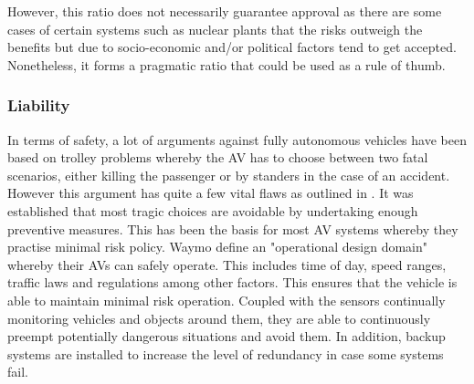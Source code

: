 However, this ratio does not necessarily guarantee approval as there are some cases of certain systems such as nuclear plants that the risks outweigh the benefits but due to socio-economic and/or political factors tend to get accepted. Nonetheless, it forms a pragmatic ratio that could be used as a rule of thumb.
\subsubsection*{Liability}
In terms of safety, a lot of arguments against fully autonomous vehicles have been based on trolley problems whereby the AV has to choose between two fatal scenarios, either killing the passenger or by standers in the case of an accident. However this argument has quite a few vital flaws as outlined in \cite{fried2012does}. It was established that most tragic choices are avoidable by undertaking enough preventive measures. This has been the basis for most AV systems whereby they practise minimal risk policy.  Waymo define an "operational design domain" whereby their AVs can safely operate. This includes time of day, speed ranges, traffic laws and regulations among other factors\cite{waymo_2018}. This ensures that the vehicle is able to maintain minimal risk operation. Coupled with the sensors continually monitoring vehicles and objects around them, they are able to continuously preempt potentially dangerous situations and avoid them. In addition, backup systems are installed to increase the level of redundancy in case some systems fail.

